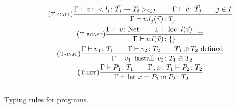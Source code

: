 \begin{myfigure}
  \begin{gather*}
    \tag{\Tcall}
    \frac{
      \Gamma \type v \colon \anyObjd
      \qquad
      \Gamma \type \vec v \colon \vec T_j
      \qquad
      j \in I
    }
    {
      \Gamma \type \invk v {l_j} {\vec v} \colon T_j
    }
    \\[\rulespace]
    \tag{\Tbcast}
    \frac{
      \Gamma \type v \colon \netTypek
      \qquad
      \Gamma \type \invk \lock l {\vec v} \colon \_
    }
    {
      \Gamma \type \invkd \colon \obj {}
    }
    \\[\rulespace]
    \tag{\Tinst}
    \frac{
      \Gamma \type v_1 \colon T_1
      \qquad
      \Gamma \type v_2 \colon T_2
      \qquad
      T_1 \oplus T_2 \text{ defined}
    }
    {
      \Gamma \type \install {v_1} {v_2} \colon T_1 \oplus T_2
    }
    \\[\rulespace]
    \tag{\Tlet}
    \frac{
      \Gamma \type P_1 \colon T_1
      \qquad
      \Gamma
      \disj x \colon T_1 \type P_2 \colon T_2
    }
    {
      \Gamma \type \Let x {P_1} {P_2} \colon T_2
    }
  \end{gather*}
  \\[-0.4cm]
\caption{Typing rules for programs.}
\label{fig:type-system-programs}
\end{myfigure}

